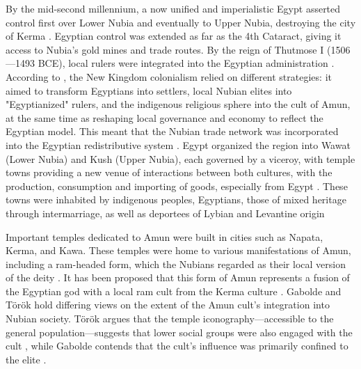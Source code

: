 By the mid-second millennium, a now unified and imperialistic Egypt asserted control first over Lower Nubia and eventually to Upper Nubia, destroying the city of Kerma \parencite[p.~78]{edwardsNubianArchaeologySudan2004}. Egyptian control was extended as far as the 4th Cataract, giving it access to Nubia's gold mines and trade routes. By the reign of Thutmose I (1506---1493 BCE), local rulers were integrated into the Egyptian administration \parencites[p.~76]{morkotBlackPharaohsEgypts2000}[p.~99]{törökKingdomKushHandbook1997}. According to \textcite{morrisAncientEgyptianImperialism2018}, the New Kingdom colonialism relied on different strategies: it aimed to transform Egyptians into settlers, local Nubian elites into "Egyptianized" rulers, and the indigenous religious sphere into the cult of Amun, at the same time as reshaping local governance and economy to reflect the Egyptian model. This meant that the Nubian trade network was incorporated into the Egyptian redistributive system \parencites[p.~157]{törökKingdomKushHandbook1997, törökTwoWorldsFrontier2009}{morkotConqueredConquerorOrganization2013}. Egypt organized the region into Wawat (Lower Nubia) and Kush (Upper Nubia), each governed by a viceroy, with temple towns providing a new venue of interactions between both cultures, with the production, consumption and importing of goods, especially from Egypt \parencites{kempFortifiedTownsNubia1972}{roseSesebiCeramicsChronology2017}[p.~343]{spencerBuildingNewGround2017}{viethNewKingdomTemple2019}{budkaMaterialRemainsNew2020}. These towns were inhabited by indigenous peoples, Egyptians, those of mixed heritage through intermarriage, as well as deportees of Lybian and Levantine origin \parencites{smithWretchedKushEthnic2003}{langerEgyptianDeportationsLate2021}


Important temples dedicated to Amun were built in cities such as Napata, Kerma, and Kawa. These temples were home to various manifestations of Amun, including a ram-headed form, which the Nubians regarded as their local version of the deity \parencite{gaboldeAmunCultIts2020}. It has been proposed that this form of Amun represents a fusion of the Egyptian god with a local ram cult from the Kerma culture \parencites[p.~77]{bonnetKermaRoyaumeNubie1990}{valbelleAmonRêKerma2003}[p.~227]{törökTwoWorldsFrontier2009}. Gabolde and Török hold differing views on the extent of the Amun cult's integration into Nubian society. Török argues that the temple iconography---accessible to the general population---suggests that lower social groups were also engaged with the cult \parencite[p.~210]{törökTwoWorldsFrontier2009}, while Gabolde contends that the cult's influence was primarily confined to the elite \parencite[p.~354]{gaboldeAmunCultIts2020}.


